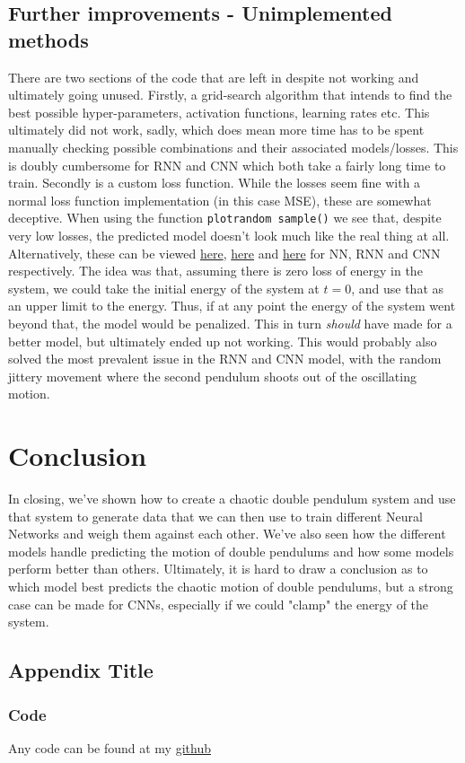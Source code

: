 \documentclass{article}
\begin{document}
\subsection{Further improvements - Unimplemented methods}
There are two sections of the code that are left in despite not working and ultimately going unused. Firstly, a grid-search algorithm that intends to find the best possible hyper-parameters, activation functions, learning rates etc. This ultimately did not work, sadly, which does mean more time has to be spent manually checking possible combinations and their associated models/losses. This is doubly cumbersome for RNN and CNN which both take a fairly long time to train. \newline
Secondly is a custom loss function. While the losses seem fine with a normal loss function implementation (in this case MSE), these are somewhat deceptive. When using the function \texttt{plot\textunderscore random \textunderscore sample()} we see that, despite very low losses, the predicted model doesn't look much like the real thing at all. Alternatively, these can be viewed \href{https://github.com/simloken/FYS5429/blob/main/Project/figures/randomly_sampled_run_NN.gif}{here}, \href{https://github.com/simloken/FYS5429/blob/main/Project/figures/randomly_sampled_run_RNN.gif}{here} and \href{https://github.com/simloken/FYS5429/blob/main/Project/figures/randomly_sampled_run_CNN.gif}{here} for NN, RNN and CNN respectively. The idea was that, assuming there is zero loss of energy in the system, we could take the initial energy of the system at $t=0$, and use that as an upper limit to the energy. Thus, if at any point the energy of the system went beyond that, the model would be penalized. This in turn \emph{should} have made for a better model, but ultimately ended up not working. This would probably also solved the most prevalent issue in the RNN and CNN model, with the random jittery movement where the second pendulum shoots out of the oscillating motion.
\section{Conclusion}
In closing, we've shown how to create a chaotic double pendulum system and use that system to generate data that we can then use to train different Neural Networks and weigh them against each other. We've also seen how the different models handle predicting the motion of double pendulums and how some models perform better than others. Ultimately, it is hard to draw a conclusion as to which model best predicts the chaotic motion of double pendulums, but a strong case can be made for CNNs, especially if we could "clamp" the energy of the system.


\newpage
\renewcommand*\appendixpagename{\Large Appendices}
\appendixpage
\addappheadtotoc
\renewcommand{\thesubsection}{\Alph{subsection}}
\subsection{Appendix Title}
\subsubsection{Code}
Any code can be found at my \href{https://github.com/simloken/FYS5429/tree/main/Project}{github}
\end{document}

